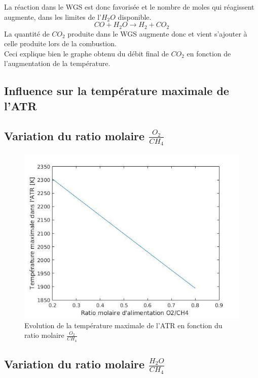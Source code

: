 \documentclass[12pt]{report}
\begin{document}
 La réaction dans le WGS est donc favorisée et le nombre de moles qui réagissent augmente, dans les limites de l'$H_2O$ disponible.
 \begin{equation}
CO + H_2O \rightarrow H_2 + CO_2
\end{equation}
La quantité de $CO_2$ produite dans le WGS augmente donc et vient s'ajouter à celle produite lors de la combustion.\\

Ceci explique bien le graphe obtenu du débit final de $CO_2$ en fonction de l'augmentation de la température.


\textcolor{carmine}{\chapter{Influence sur la température maximale de l'ATR}}

\section{Variation du ratio molaire $\frac{O_2}{CH_4}$}



\begin{figure}[H]
\begin{center}
\includegraphics[scale=0.6]{Tmax_ratio_O2}
\caption{Evolution de la température maximale de l'ATR en fonction du ratio molaire $\frac{O_2}{CH_4}$}
\end{center}
\end{figure}


\section{Variation du ratio molaire $\frac{H_2O}{CH_4}$}
\end{document}
